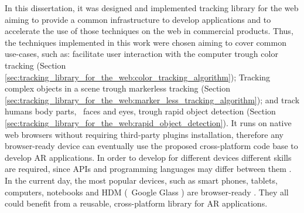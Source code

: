 In this dissertation, it was designed and implemented tracking library for the web aiming to provide a common infrastructure to develop applications and to accelerate the use of those techniques on the web in commercial products. Thus, the techniques implemented in this work were chosen aiming to cover common use-cases, such as: facilitate user interaction with the computer trough color tracking (Section \ref{sec:tracking_library_for_the_web:color_tracking_algorithm}); Tracking complex objects in a scene trough markerless tracking (Section \ref{sec:tracking_library_for_the_web:marker_less_tracking_algorithm}); and track humans body parts, \eg\ faces and eyes, trough rapid object detection (Section \ref{sec:tracking_library_for_the_web:rapid_object_detection}).
It runs on native web browsers without requiring third-party plugins installation, therefore any browser-ready device can eventually use the proposed cross-platform code base to develop AR applications. In order to develop for different devices different skills are required, since APIs and programming languages may differ between them \cite{MDN2013,International2009}. In the current day, the most popular devices, such as smart phones, tablets, computers, notebooks and HDM (\ie\ Google Glass \cite{Glass2013}) \cite{Benford1998} are browser-ready \cite{Hickson2013}. They all could benefit from a reusable, cross-platform library for AR applications.



